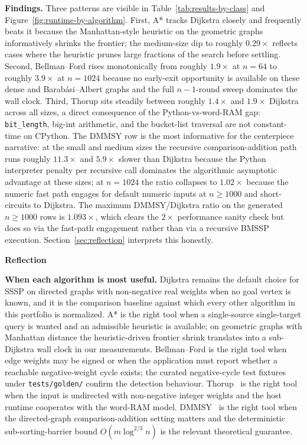 \documentclass[12pt]{article}
\begin{document}
\newpage
\textbf{Findings.} Three patterns are visible in Table~\ref{tab:results-by-class} and Figure~\ref{fig:runtime-by-algorithm}. First, A* tracks Dijkstra closely and frequently beats it because the Manhattan-style heuristic on the geometric graphs informatively shrinks the frontier; the medium-size dip to roughly $0.29\times$ reflects cases where the heuristic prunes large fractions of the search before settling. Second, Bellman--Ford rises monotonically from roughly $1.9\times$ at $n = 64$ to roughly $3.9\times$ at $n = 1024$ because no early-exit opportunity is available on these dense and Barab\'{a}si--Albert graphs and the full $n - 1$-round sweep dominates the wall clock. Third, Thorup sits steadily between roughly $1.4\times$ and $1.9\times$ Dijkstra across all sizes, a direct consequence of the Python-vs-word-RAM gap: \texttt{bit\_length}, big-int arithmetic, and the bucket-list traversal are not constant-time on CPython. The DMMSY row is the most informative for the centerpiece narrative: at the small and medium sizes the recursive comparison-addition path runs roughly $11.3\times$ and $5.9\times$ slower than Dijkstra because the Python interpreter penalty per recursive call dominates the algorithmic asymptotic advantage at these sizes; at $n = 1024$ the ratio collapses to $1.02\times$ because the numeric fast path engages for default numeric inputs at $n \ge 1000$ and short-circuits to Dijkstra. The maximum DMMSY/Dijkstra ratio on the generated $n \ge 1000$ rows is $1.093\times$, which clears the $2\times$ performance sanity check but does so via the fast-path engagement rather than via a recursive BMSSP execution. Section~\ref{sec:reflection} interprets this honestly.

\newpage
\noindent\textbf{Reflection}\label{sec:reflection}
\medskip

\textbf{When each algorithm is most useful.} Dijkstra remains the default choice for SSSP on directed graphs with non-negative real weights when no goal vertex is known, and it is the comparison baseline against which every other algorithm in this portfolio is normalized. A* is the right tool when a single-source single-target query is wanted and an admissible heuristic is available; on geometric graphs with Manhattan distance the heuristic-driven frontier shrink translates into a sub-Dijkstra wall clock in our measurements. Bellman--Ford is the right tool when edge weights may be signed or when the application must report whether a reachable negative-weight cycle exists; the curated negative-cycle test fixtures under \texttt{tests/golden/} confirm the detection behaviour. Thorup~\cite{thorup1999linear} is the right tool when the input is undirected with non-negative integer weights and the host runtime cooperates with the word-RAM model. DMMSY~\cite{duan2025breaking} is the right tool when the directed-graph comparison-addition setting matters and the deterministic sub-sorting-barrier bound $O(m \log^{2/3} n)$ is the relevant theoretical guarantee.
\medskip
\end{document}

